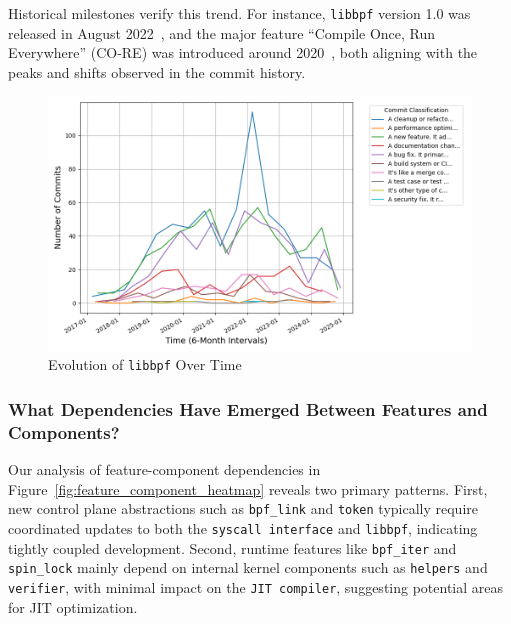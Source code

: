Historical milestones verify this trend. For instance, \texttt{libbpf} version 1.0 was released in August 2022~\cite{libbpf1}, and the major feature ``Compile Once, Run Everywhere'' (CO-RE) was introduced around 2020~\cite{core}, both aligning with the peaks and shifts observed in the commit history.

\begin{figure}[ht]
    \centering
    \includegraphics[width=\linewidth]{feature-analysis/libbpf_evolution_by_classification.png}
    \caption{Evolution of \texttt{libbpf} Over Time}
    \label{fig:libbpf_commit_classification}
\end{figure}

\subsubsection{What Dependencies Have Emerged Between Features and Components?}

Our analysis of feature-component dependencies in Figure~\ref{fig:feature_component_heatmap} reveals two primary patterns. First, new control plane abstractions such as \texttt{bpf\_link}\cite{bpflink} and \texttt{token}\cite{token} typically require coordinated updates to both the \texttt{syscall interface} and \texttt{libbpf}, indicating tightly coupled development. Second, runtime features like \texttt{bpf\_iter}\cite{bpf_iterators} and \texttt{spin\_lock}\cite{spinlock} mainly depend on internal kernel components such as \texttt{helpers} and \texttt{verifier}, with minimal impact on the \texttt{JIT compiler}, suggesting potential areas for JIT optimization.


